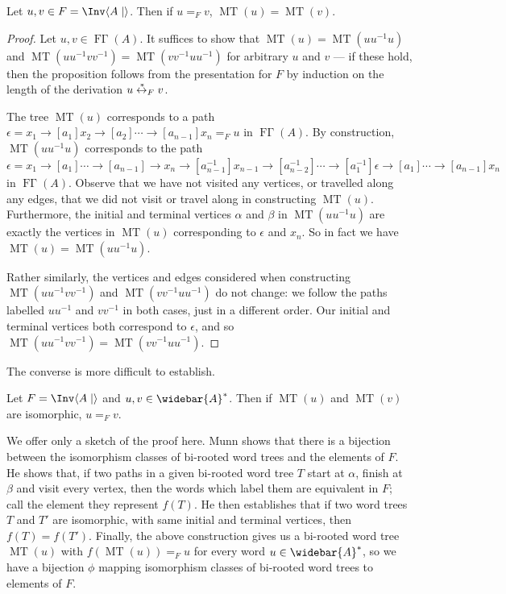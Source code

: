 \documentclass[noindex,noinsetproof,12pt]{lmaths}
\newcommand{\leftrightst}{\mathrel{\smash{\stackrel{\hspace{0.1em}\ast}{\leftrightarrow}}}}
\newcommand{\Abar}{\widebar{A}}
\DeclareMathOperator{\FGamma}{F\Gamma}
\DeclareMathOperator{\MT}{MT}
\begin{document}
\begin{prop}
	Let $u, v \in F = \Inv \langle A \mid\rangle$. Then if $u =_F v$, $\MT(u) = \MT(v)$.
\end{prop}
\begin{proof}
	Let $u, v \in \FGamma(A)$. It suffices to show that $\MT(u) = \MT(uu^{-1}u)$ and $\MT(uu^{-1}vv^{-1}) = \MT(vv^{-1}uu^{-1})$ for arbitrary $u$ and $v$ --- if these hold, then the proposition follows from the presentation for $F$ by induction on the length of the derivation $u \leftrightst_{F} v$.

	The tree $\MT(u)$ corresponds to a path $\epsilon = x_1 \to[a_1] x_2 \to[a_2] \cdots \to[a_{n-1}] x_n =_F u$ in $\FGamma(A)$. By construction, $\MT(uu^{-1}u)$ corresponds to the path $\epsilon = x_1 \to[a_1] \cdots \to[a_{n-1}] \to x_n \to[a_{n-1}^{-1}] x_{n-1} \to[a_{n-2}^{-1}] \cdots \to[a_1^{-1}] \epsilon \to[a_1] \cdots \to[a_{n-1}] x_n$ in $\FGamma(A)$. Observe that we have not visited any vertices, or travelled along any edges, that we did not visit or travel along in constructing $\MT(u)$. Furthermore, the initial and terminal vertices $\alpha$ and $\beta$ in $\MT(uu^{-1}u)$ are exactly the vertices in $\MT(u)$ corresponding to $\epsilon$ and $x_n$. So in fact we have $\MT(u) = \MT(uu^{-1}u)$.

	Rather similarly, the vertices and edges considered when constructing $\MT(uu^{-1}vv^{-1})$ and $\MT(vv^{-1}uu^{-1})$ do not change: we follow the paths labelled $uu^{-1}$ and $vv^{-1}$ in both cases, just in a different order. Our initial and terminal vertices both correspond to $\epsilon$, and so $\MT(uu^{-1}vv^{-1}) = \MT(vv^{-1}uu^{-1})$.
\end{proof}

The converse is more difficult to establish.
\begin{prop}
	Let $F = \Inv \langle A \mid\rangle$ and $u, v \in \Abar^*$. Then if $\MT(u)$ and $\MT(v)$ are isomorphic, $u =_F v$.\label{prop:MT-isomorphic-u=Fv}
\end{prop}
We offer only a sketch of the proof here. Munn shows that there is a bijection between the isomorphism classes of bi-rooted word trees and the elements of $F$. He shows that, if two paths in a given bi-rooted word tree $T$ start at $\alpha$, finish at $\beta$ and visit every vertex, then the words which label them are equivalent in $F$; call the element they represent $f(T)$. He then establishes that if two word trees $T$ and $T'$ are isomorphic, with same initial and terminal vertices, then $f(T) = f(T')$. Finally, the above construction gives us a bi-rooted word tree $\MT(u)$ with $f(\MT(u)) =_F u$ for every word $u \in \Abar^*$, so we have a bijection $\phi$ mapping isomorphism classes of bi-rooted word trees to elements of $F$.
\end{document}
